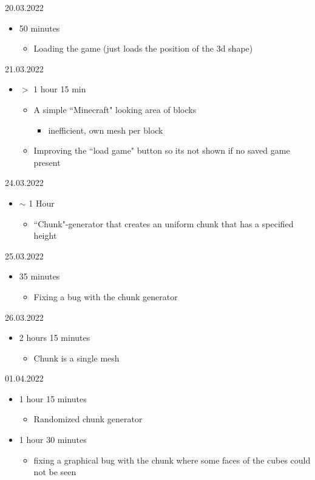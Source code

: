 \documentclass{article}
\begin{document}
20.03.2022
\begin{itemize}
	\item 50 minutes
	\begin{itemize}
		\item Loading the game (just loads the position of the 3d shape)
	\end{itemize}
\end{itemize}

21.03.2022
\begin{itemize}
	\item $>$ 1 hour 15 min
	\begin{itemize}
		\item A simple ``Minecraft" looking area of blocks
		\begin{itemize}
			\item inefficient, own mesh per block
		\end{itemize}
	\item Improving the ``load game" button so its not shown if no saved game present
	\end{itemize}
\end{itemize}

24.03.2022
\begin{itemize}
	\item $\sim$ 1 Hour
	\begin{itemize}
		\item ``Chunk"-generator that creates an uniform chunk that has a specified height
	\end{itemize}
\end{itemize}

25.03.2022
\begin{itemize}
	\item 35 minutes
	\begin{itemize}
		\item Fixing a bug with the chunk generator
	\end{itemize}
\end{itemize}

26.03.2022
\begin{itemize}
	\item 2 hours 15 minutes
	\begin{itemize}
		\item Chunk is a single mesh
	\end{itemize}
\end{itemize}

01.04.2022
\begin{itemize}
	\item 1 hour 15 minutes
	\begin{itemize}
		\item Randomized chunk generator
	\end{itemize}
    \item 1 hour 30 minutes
    \begin{itemize}
    	\item fixing a graphical bug with the chunk where some faces of the cubes could not be seen
    \end{itemize}
\end{itemize}
\end{document}
